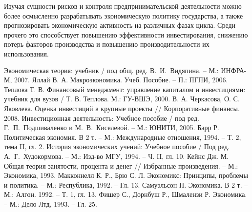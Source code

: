 Изучая сущности рисков и контроля предпринимательской деятельности можно более
осмысленно разрабатывать экономическую политику государства, а также
прогнозировать экономическую активность на различных фазах цикла. Среди прочего
это способствует повышению эффективности инвестирования, снижению потерь
факторов производства и повышению производительности их использования.

\newpage %
\renewcommand{\bibname}{Список литературы}

\begin{thebibliography}{99} 
     Экономическая теория: учебник / под общ. ред. В.~И.~Видяпина.
    -- М.: ИНФРА-М, 2007.
     Яллай В. А. Макроэкономика. Учеб. Пособие. -- П.: ПГПИ, 2006.
     Теплова Т. В. Финансовый менеджмент: управление капиталом и
    инвестициями: учебник для вузов / Т. В. Теплова. М.: ГУ-ВШЭ, 2000.
     В. А. Черкасова, О. С. Яковлева. Оценка инвестиций в крупные
    проекты // Корпоративные финансы. 2008.
     Инвестиционная деятельность: Учебное пособие / под ред.
    Г.~П.~Подшиваленко и М.~В.~Киселевой. -- М.: ЮНИТИ, 2005. 
     Барр Р. Политическая экономия. В 2 т. -- М.: Международные
    отношения, 1994. -- Т. 2, тема II, гл. 2.
     История экономических учений: Учебное пособие / Под ред.
    А.~Г.~Худокормова. -- М.: Изд-во МГУ, 1994. -- Ч. II, гл. 10.
     Кейнс Дж. М. Общая теория занятости, процента и денег
    // Избранные произведения. -- М.: Экономика, 1993.
     Макконнелл К. Р., Брю С. Л. Экономикс: Принципы, проблемы и
    политика. -- М.: Республика, 1992. -- Гл. 13.
     Самуэльсон П. Экономика. В 2 т. -- М.: Алгон. 1992. -- Т. 1,
    гл. 13. 
     Фишер С., Дорнбуш Р., Шмалензи Р. Экономика. -- М.: Дело Лтд,
    1993. -- Гл. 25.
\end{thebibliography}